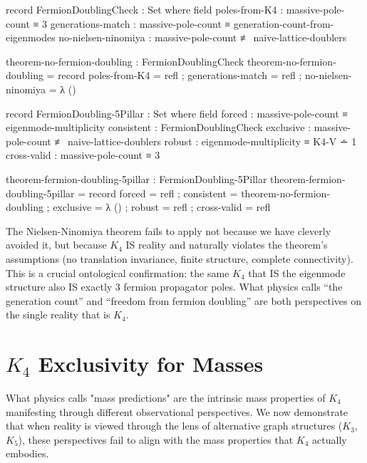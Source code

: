 \documentclass[11pt,a4paper]{book}
\begin{document}
\begin{code}
record FermionDoublingCheck : Set where
  field
    poles-from-K4        : massive-pole-count ≡ 3
    generations-match    : massive-pole-count ≡ generation-count-from-eigenmodes
    no-nielsen-ninomiya  : massive-pole-count ≢ naive-lattice-doublers
    
theorem-no-fermion-doubling : FermionDoublingCheck
theorem-no-fermion-doubling = record
  { poles-from-K4       = refl
  ; generations-match   = refl
  ; no-nielsen-ninomiya = λ ()
  }

record FermionDoubling-5Pillar : Set where
  field
    forced       : massive-pole-count ≡ eigenmode-multiplicity
    consistent   : FermionDoublingCheck
    exclusive    : massive-pole-count ≢ naive-lattice-doublers
    robust       : eigenmode-multiplicity ≡ K4-V ∸ 1
    cross-valid  : massive-pole-count ≡ 3

theorem-fermion-doubling-5pillar : FermionDoubling-5Pillar
theorem-fermion-doubling-5pillar = record
  { forced      = refl
  ; consistent  = theorem-no-fermion-doubling
  ; exclusive   = λ ()
  ; robust      = refl
  ; cross-valid = refl
  }
\end{code}

The Nielsen-Ninomiya theorem fails to apply not because we have cleverly avoided it, but because $K_4$ IS reality and naturally violates the theorem's assumptions (no translation invariance, finite structure, complete connectivity). This is a crucial ontological confirmation: the same $K_4$ that IS the eigenmode structure also IS exactly 3 fermion propagator poles. What physics calls ``the generation count'' and ``freedom from fermion doubling'' are both perspectives on the single reality that is $K_4$.


\chapter{\texorpdfstring{$K_4$}{K4} Exclusivity for Masses}
\label{chap:K4-exclusivity-masses}

What physics calls "mass predictions" are the intrinsic mass properties of $K_4$ manifesting through different observational perspectives. We now demonstrate that when reality is viewed through the lens of alternative graph structures ($K_3$, $K_5$), these perspectives fail to align with the mass properties that $K_4$ actually embodies.
\end{document}
